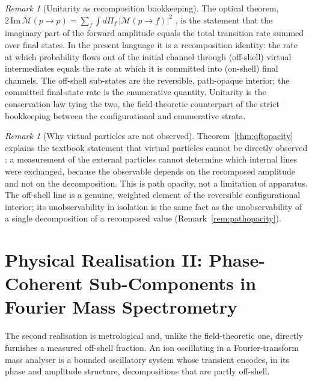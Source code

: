 \documentclass[11pt,a4paper]{article}
\theoremstyle{thmstyle}
\theoremstyle{definition}
\theoremstyle{remark}
\newtheorem{remark}[theorem]{Remark}
\newcommand{\Mmat}{\mathcal{M}}
\begin{document}
\begin{remark}[Unitarity as recomposition bookkeeping]
\label{rem:unitarity}
The optical theorem,
$2\,\mathrm{Im}\,\Mmat(p\!\to\!p)=\sum_f\int d\Pi_f\,|\Mmat(p\!\to\!f)|^2$
\citep{peskin1995,cutkosky1960}, is the statement that the imaginary part
of the forward amplitude equals the total transition rate summed over final
states. In the present language it is a recomposition identity: the rate at
which probability flows out of the initial channel through (off-shell)
virtual intermediates equals the rate at which it is committed into
(on-shell) final channels. The off-shell sub-states are the reversible,
path-opaque interior; the committed final-state rate is the
enumerative quantity. Unitarity is the conservation law tying the two,
the field-theoretic counterpart of the strict bookkeeping between the
configurational and enumerative strata.
\end{remark}

\begin{remark}[Why virtual particles are not observed]
\label{rem:notobserved}
Theorem~\ref{thm:qftopacity} explains the textbook statement that virtual
particles cannot be directly observed \citep{peskin1995}: a measurement of
the external particles cannot determine which internal lines were
exchanged, because the observable depends on the recomposed amplitude and
not on the decomposition. This is path opacity, not a limitation of
apparatus. The off-shell line is a genuine, weighted element of the
reversible configurational interior; its unobservability in isolation is
the same fact as the unobservability of a single decomposition of a
recomposed value (Remark~\ref{rem:pathopacity}).
\end{remark}

\section{Physical Realisation II: Phase-Coherent Sub-Components in
Fourier Mass Spectrometry}
\label{sec:ms}

The second realisation is metrological and, unlike the field-theoretic
one, directly furnishes a measured off-shell fraction. An ion oscillating
in a Fourier-transform mass analyser is a bounded oscillatory system whose
transient encodes, in its phase and amplitude structure, decompositions
that are partly off-shell.
\end{document}
